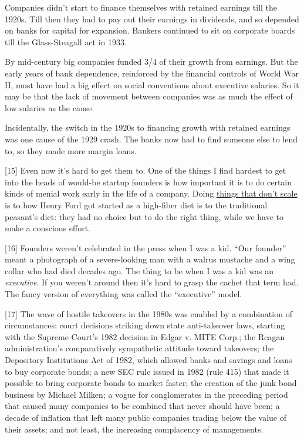 Companies didn't start to finance themselves with retained earnings till
the 1920s. Till then they had to pay out their earnings in dividends,
and so depended on banks for capital for expansion. Bankers continued to
sit on corporate boards till the Glass-Steagall act in 1933.

By mid-century big companies funded 3/4 of their growth from earnings.
But the early years of bank dependence, reinforced by the financial
controls of World War II, must have had a big effect on social
conventions about executive salaries. So it may be that the lack of
movement between companies was as much the effect of low salaries as the
cause.

Incidentally, the switch in the 1920s to financing growth with retained
earnings was one cause of the 1929 crash. The banks now had to find
someone else to lend to, so they made more margin loans.

{[}15{]} Even now it's hard to get them to. One of the things I find
hardest to get into the heads of would-be startup founders is how
important it is to do certain kinds of menial work early in the life of
a company. Doing \href{ds.html}{things that don't scale} is to how Henry
Ford got started as a high-fiber diet is to the traditional peasant's
diet: they had no choice but to do the right thing, while we have to
make a conscious effort.

{[}16{]} Founders weren't celebrated in the press when I was a kid.
``Our founder'' meant a photograph of a severe-looking man with a walrus
mustache and a wing collar who had died decades ago. The thing to be
when I was a kid was an \emph{executive}. If you weren't around then
it's hard to grasp the cachet that term had. The fancy version of
everything was called the ``executive'' model.

{[}17{]} The wave of hostile takeovers in the 1980s was enabled by a
combination of circumstances: court decisions striking down state
anti-takeover laws, starting with the Supreme Court's 1982 decision in
Edgar v. MITE Corp.; the Reagan administration's comparatively
sympathetic attitude toward takeovers; the Depository Institutions Act
of 1982, which allowed banks and savings and loans to buy corporate
bonds; a new SEC rule issued in 1982 (rule 415) that made it possible to
bring corporate bonds to market faster; the creation of the junk bond
business by Michael Milken; a vogue for conglomerates in the preceding
period that caused many companies to be combined that never should have
been; a decade of inflation that left many public companies trading
below the value of their assets; and not least, the increasing
complacency of managements.

